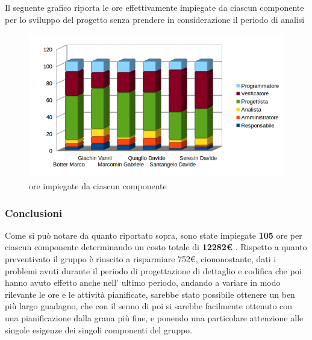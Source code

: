 Il seguente grafico riporta le ore effettivamente impiegate da ciascun componente per lo sviluppo del progetto senza prendere in considerazione il periodo di analisi
\begin{figure}[H] \centering \includegraphics[width=%
\textwidth]
{../modello/img/totruoli.png} \caption{ore impiegate da ciascun componente}
\end{figure}
\subsubsection{Conclusioni}
Come si può notare da quanto riportato sopra, sono state impiegate \textbf{105} ore per ciascun componente determinando un costo totale di \textbf{12282\euro} . Rispetto a quanto preventivato il gruppo è riuscito a risparmiare 752\euro , ciononostante, dati i problemi avuti durante il periodo di progettazione di dettaglio e codifica che poi hanno avuto effetto anche nell' ultimo periodo, andando a variare in modo rilevante le ore e le attività pianificate, sarebbe stato possibile ottenere un ben più largo guadagno, che con il senno di poi si sarebbe facilmente ottenuto con una pianificazione dalla grana più fine, e ponendo una particolare attenzione alle singole esigenze dei singoli componenti del gruppo.